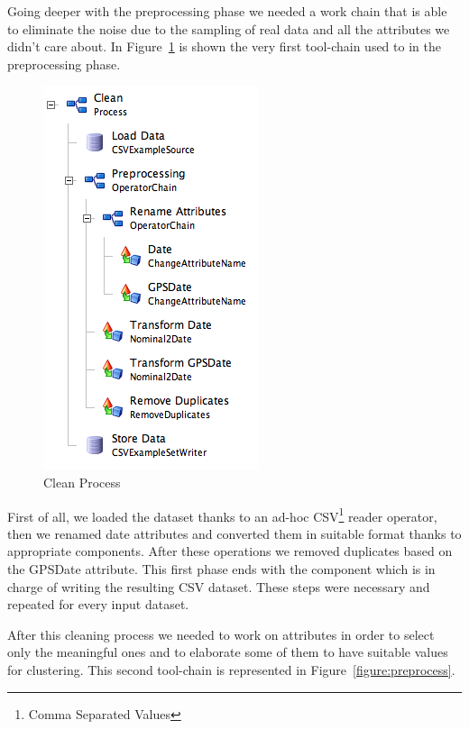 Going deeper with the preprocessing phase we needed a work chain that is able to eliminate the noise due to the sampling of real data and all the attributes we didn't care about.
In Figure~\ref{figure:clean} is shown the very first tool-chain used to in the preprocessing phase.\\


\begin{figure}
  \begin{center}
    \includegraphics[scale=0.6]{images/clean.png}
  \end{center}
  \caption{Clean Process}
  \label{figure:clean}
\end{figure}

First of all, we loaded the dataset thanks to an ad-hoc CSV\footnote{Comma Separated Values} reader operator, then we renamed date attributes and converted them in suitable format thanks to appropriate components. After these operations we removed duplicates based on the GPSDate attribute. This first phase ends with the component which is in charge of writing the resulting CSV dataset. These steps were necessary and repeated for every input dataset.\newline

After this cleaning process we needed to work on attributes in order to select only the meaningful ones and to elaborate some of them to have suitable values for clustering. This second tool-chain is represented in Figure~\ref{figure:preprocess}.

